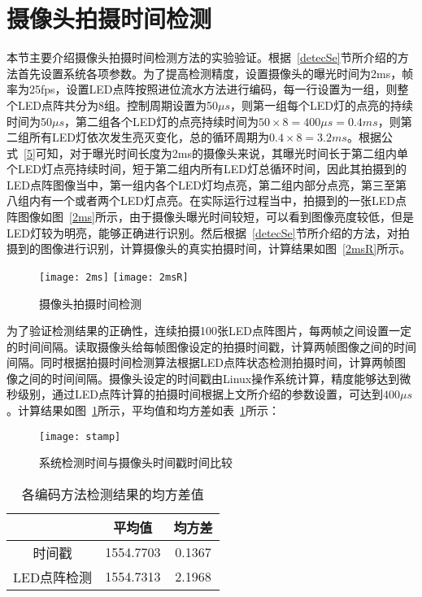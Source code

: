 \section{摄像头拍摄时间检测}
\label{detSec}

本节主要介绍摄像头拍摄时间检测方法的实验验证。根据~\ref{detecSe}节所介绍的方法首先设置系统各项参数。为了提高检测精度，设置摄像头的曝光时间为2ms，帧率为25fps，设置LED点阵按照进位流水方法进行编码，每一行设置为一组，则整个LED点阵共分为8组。控制周期设置为50$\mu s$，则第一组每个LED灯的点亮的持续时间为50$\mu s$，第二组各个LED灯的点亮持续时间为$50 \times 8 = 400\mu s = 0.4ms$，则第二组所有LED灯依次发生亮灭变化，总的循环周期为$0.4 \times 8 = 3.2ms$。根据公式~\ref{5}可知，对于曝光时间长度为2ms的摄像头来说，其曝光时间长于第二组内单个LED灯点亮持续时间，短于第二组内所有LED灯总循环时间，因此其拍摄到的LED点阵图像当中，第一组内各个LED灯均点亮，第二组内部分点亮，第三至第八组内有一个或者两个LED灯点亮。在实际运行过程当中，拍摄到的一张LED点阵图像如图~\ref{2ms}所示，由于摄像头曝光时间较短，可以看到图像亮度较低，但是LED灯较为明亮，能够正确进行识别。然后根据~\ref{detecSe}节所介绍的方法，对拍摄到的图像进行识别，计算摄像头的真实拍摄时间，计算结果如图~\ref{2msR}所示。

\begin{figure}[h] 
  \centering%
    {\texttt{[image: 2ms]}}
      {\texttt{[image: 2msR]}}
  \caption{摄像头拍摄时间检测}
\end{figure}

为了验证检测结果的正确性，连续拍摄100张LED点阵图片，每两帧之间设置一定的时间间隔。读取摄像头给每帧图像设定的拍摄时间戳，计算两帧图像之间的时间间隔。同时根据拍摄时间检测算法根据LED点阵状态检测拍摄时间，计算两帧图像之间的时间间隔。摄像头设定的时间戳由Linux操作系统计算，精度能够达到微秒级别，通过LED点阵计算的拍摄时间根据上文所介绍的参数设置，可达到$400\mu s$。计算结果如图~\ref{stamp}所示，平均值和均方差如表~\ref{codingT}所示：

\begin{figure}[h] 
  \centering
  \texttt{[image: stamp]}
  \caption{系统检测时间与摄像头时间戳时间比较}
    \label{stamp}
\end{figure}

\begin{table}[h]
  \centering
  \caption{各编码方法检测结果的均方差值} 
  \label{codingT}
  \begin{tabular}{|c|c|c|}\hline
  &  平均值 &  均方差 \\ \hline 
  时间戳 & 1554.7703 &0.1367\\ \hline
  LED点阵检测 & 1554.7313 & 2.1968\\ \hline
  \end{tabular}
\end{table}

